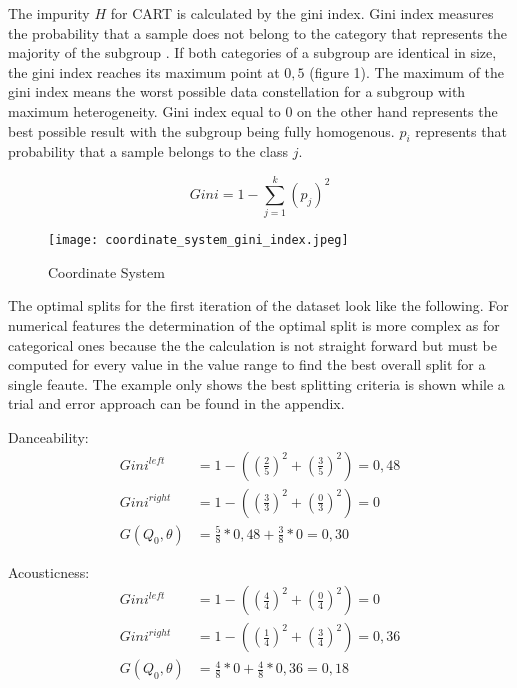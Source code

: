 The impurity \(H\) for \ac{CART} is calculated by the gini index. Gini index measures the probability that a sample 
does not belong to the category that represents the majority of the subgroup \cite[p.335]{James2021}. If both 
categories of a subgroup are identical in size, the gini index reaches its maximum point at \(0,5\) (figure 1). The 
maximum of the gini index means the worst possible data constellation for a subgroup with maximum heterogeneity. 
Gini index equal to \(0\) on the other hand represents the best possible result with the subgroup being fully 
homogenous. \(p_{i}\) represents that probability that a sample belongs to the class \(j\).

\begin{equation}
Gini = 1 - \sum ^k_{j = 1}(p_{j})^2
\end{equation}

\begin{figure}[H]
    \centering
    \caption[]{Coordinate System}
	\label{fig:coordinate_system_initial_dataset}
    \texttt{[image: coordinate\_system\_gini\_index.jpeg]}
\end{figure}

The optimal splits for the first iteration of the dataset look like the following. For numerical features the determination of 
the optimal split is more complex as for categorical ones because the the calculation is not straight forward but must be computed
for every value in the value range to find the best overall split for a single feaute. The example only shows the best splitting
criteria is shown while a trial and error approach can be found in the appendix. 

Danceability: 
\begin{equation*}
    \begin{aligned}
        Gini^{left} &= 1 - ((\frac{2}{5})^2 + (\frac{3}{5})^2) = 0,48 
        \\
        Gini^{right}  &= 1 - ((\frac{3}{3})^2 + (\frac{0}{3})^2) = 0 
        \\
        G(Q_{0},\theta) &= \frac{5}{8} * 0,48 + \frac{3}{8} * 0 = 0,30
    \end{aligned}
\end{equation*}

Acousticness: 
\begin{equation*}
    \begin{aligned}
        Gini^{left}  &= 1 - ((\frac{4}{4})^2 + (\frac{0}{4})^2) = 0
        \\
        Gini^{right} &= 1 - ((\frac{1}{4})^2 + (\frac{3}{4})^2) = 0,36
        \\
        G(Q_{0},\theta) &= \frac{4}{8} * 0 + \frac{4}{8} * 0,36 = 0,18
    \end{aligned}
\end{equation*}

